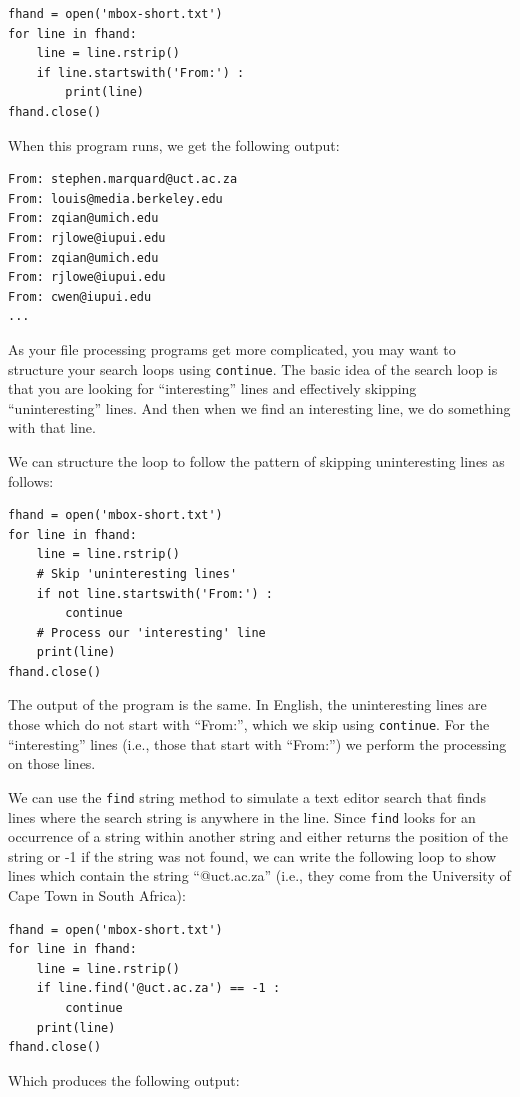 \beforeverb
\begin{verbatim}
fhand = open('mbox-short.txt')
for line in fhand:
    line = line.rstrip()
    if line.startswith('From:') :
        print(line)
fhand.close()
\end{verbatim}
\afterverb
%
When this program runs, we get the following output:

\beforeverb
\begin{verbatim}
From: stephen.marquard@uct.ac.za
From: louis@media.berkeley.edu
From: zqian@umich.edu
From: rjlowe@iupui.edu
From: zqian@umich.edu
From: rjlowe@iupui.edu
From: cwen@iupui.edu
...
\end{verbatim}
\afterverb
%
As your file processing programs get more complicated, you may want 
to structure your search loops using {\tt continue}.  The basic idea 
of the search loop is that you are looking for ``interesting'' lines
and effectively skipping ``uninteresting'' lines.  And then when we
find an interesting line, we do something with that line.

We can structure the loop to follow the
pattern of skipping uninteresting lines as follows:

\beforeverb
\begin{verbatim}
fhand = open('mbox-short.txt')
for line in fhand:
    line = line.rstrip()
    # Skip 'uninteresting lines'
    if not line.startswith('From:') :
        continue
    # Process our 'interesting' line
    print(line)
fhand.close()
\end{verbatim}
\afterverb
%
The output of the program is the same.  In English, the 
uninteresting lines are those which do not start 
with ``From:'', which we skip using {\tt continue}.
For the ``interesting'' lines (i.e., those that start with ``From:'')
we perform the processing on those lines.

We can use the {\tt find} string method to simulate a text editor
search that finds lines where the search string is anywhere in the line.  
Since {\tt find} looks for an occurrence of a string within another
string and either returns the position of the string or -1 if the string
was not found, we can write the following loop to show lines which
contain the string ``@uct.ac.za'' (i.e., they come from the University 
of Cape Town in South Africa):

\beforeverb
\begin{verbatim}
fhand = open('mbox-short.txt')
for line in fhand:
    line = line.rstrip()
    if line.find('@uct.ac.za') == -1 : 
        continue
    print(line)
fhand.close()
\end{verbatim}
\afterverb
%
Which produces the following output:

